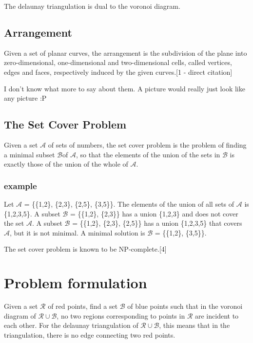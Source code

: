 \documentclass[a4paper,12pt]{article}
\begin{document}
The delaunay triangulation is dual to the voronoi diagram.


\subsection{Arrangement}
Given a set of planar curves, the arrangement is the subdivision of the plane into zero-dimensional, one-dimensional and two-dimensional cells, called vertices, edges and faces, respectively induced by the given curves.[1 - direct citation]

I don't know what more to say about them. A picture would really just look like any picture :P

\subsection{The Set Cover Problem}
Given a set $\mathcal A$ of sets of numbers, the set cover problem is the problem of finding a minimal subset $\mathcal B$of $\mathcal A$, so that the elements of the union of the sets in $\mathcal B$ is exactly those of the union of the whole of $\mathcal A$.

\subsubsection{example}
Let $\mathcal A$ =  \{\{1,2\}, \{2,3\}, \{2,5\}, \{3,5\}\}. The elements of the union of all sets of $\mathcal A$ is \{1,2,3,5\}. A subset $\mathcal B$ = \{\{1,2\}, \{2,3\}\} has a union \{1,2,3\} and does not cover the set $\mathcal A$. A subset $\mathcal B$ = \{\{1,2\}, \{2,3\}, \{2,5\}\} has a union \{1,2,3,5\} that covers $\mathcal A$, but it is not minimal. A minimal solution is $\mathcal B$ = \{\{1,2\}, \{3,5\}\}.

The set cover problem is known to be NP-complete.[4]
\section{Problem formulation}
Given a set $\mathcal{R}$ of red points, find a set $\mathcal{B}$ of blue points such that in the voronoi diagram of $\mathcal{R} \cup \mathcal{B}$, no two regions corresponding to points in $\mathcal{R}$ are incident to each other. For the delaunay triangulation of $\mathcal{R} \cup \mathcal{B}$, this means that in the triangulation, there is no edge connecting two red points.
\end{document}
